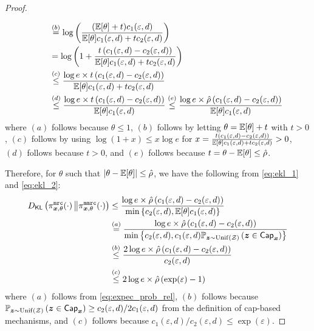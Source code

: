 \begin{proof}
\begin{enumerate}
\begin{align}
&  \qquad \stackrel{(b)}{=} \log \bigg( \dfrac{ (\mathbb{E}[\theta] + t)c_1(\varepsilon,d)}{\mathbb{E}[\theta] c_1(\varepsilon,d) + t c_2(\varepsilon,d)} \bigg) \\
& \qquad = \log \bigg(1+ \dfrac{ t\left( c_1(\varepsilon,d)-c_2(\varepsilon,d) \right)}{\mathbb{E}[\theta] c_1(\varepsilon,d) + t c_2(\varepsilon,d)} \bigg) \\
& \qquad \stackrel{(c)}{\leq} \frac{\log e \times  t\left( c_1(\varepsilon,d)-c_2(\varepsilon,d) \right)}{\mathbb{E}[\theta] c_1(\varepsilon,d) + t c_2(\varepsilon,d)} \\
& \qquad \stackrel{(d)}{\leq} \frac{\log e \times t\left( c_1(\varepsilon,d)-c_2(\varepsilon,d) \right)}{\mathbb{E}[\theta] c_1(\varepsilon,d)} \stackrel{(e)}{\leq} \frac{\log e \times \hat{\rho}\left( c_1(\varepsilon,d)-c_2(\varepsilon,d) \right)}{\mathbb{E}[\theta] c_1(\varepsilon,d)} \label{eq:ekl_2}
\end{align}
where $(a)$ follows because $\theta \leq 1$, $(b)$ follows by letting $\theta = \mathbb{E}[\theta] + t$ with $t > 0$, $(c)$ follows by using $\log (1+x) \leq x \log e$ for $x = \frac{ t\left( c_1(\varepsilon,d)-c_2(\varepsilon,d) \right)}{\mathbb{E}[\theta] c_1(\varepsilon,d) + t c_2(\varepsilon,d)} > 0$, $(d)$ follows because $t > 0$, and $(e)$ follows because $t = \theta - \mathbb{E}[\theta]  \leq \hat{\rho}$.
\end{enumerate}
Therefore, for $\theta$ such that $\left\lvert \theta- \mathbb{E}[\theta] \right\rvert \leq \hat{\rho}$, we have the following from \eqref{eq:ekl_1} and \eqref{eq:ekl_2}:
\begin{align}
    {D}_{\mathsf{KL}}\left( \pi^{\texttt{mrc}}_{{\boldsymbol{x}}, \theta}(\cdot)\, \middle\Vert \pi^{\texttt{mmrc}}_{{\boldsymbol{x}}, \theta}(\cdot) \right) & \leq \dfrac{  \log e \times \hat{\rho}\left( c_1(\varepsilon,d)-c_2(\varepsilon,d) \right)}{\min \left\{ c_2(\varepsilon,d), \mathbb{E}[\theta] c_1(\varepsilon,d)\right\}} \\
    & \stackrel{(a)}{=} \dfrac{ \log e \times \hat{\rho}\left( c_1(\varepsilon,d)-c_2(\varepsilon,d) \right)}{\min \left\{ c_2(\varepsilon,d), c_1(\varepsilon,d) \mathbb{P}_{{\boldsymbol{z}} \sim \mathrm{Unif}(\mathcal{Z})}\left( {\boldsymbol{z}} \in \mathsf{Cap}_{{\boldsymbol{x}}} \right) \right\}} \\
    & \stackrel{(b)}{\leq} \dfrac{ 2 \log e \times   \hat{\rho}\left( c_1(\varepsilon,d) - c_2(\varepsilon,d) \right)}{c_2(\varepsilon,d)} \\
    & \stackrel{(c)}{\leq} 2 \log e \times  \hat{\rho} \left( \exp(\varepsilon) - 1 \right)
    \label{eq:expected_kl_2}
\end{align}
where $(a)$ follows from \eqref{eq:expec_prob_rel}, $(b)$ follows because $\mathbb{P}_{{\boldsymbol{z}} \sim \mathrm{Unif}(\mathcal{Z})}\left( {\boldsymbol{z}} \in \mathsf{Cap}_{{\boldsymbol{x}}} \right) \geq c_2(\varepsilon,d)/2c_1(\varepsilon,d)$ from the definition of cap-based mechanisms, and $(c)$ follows because $c_1(\varepsilon,d) / c_2(\varepsilon,d) \leq \exp{(\varepsilon)}$.



\end{proof}

